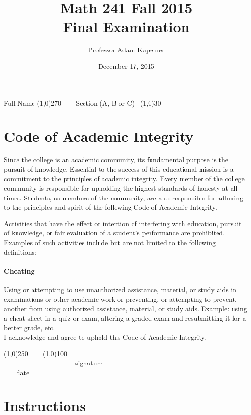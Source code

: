 \documentclass[12pt]{article}
\title{Math 241 Fall 2015 \\ Final Examination}
\author{Professor Adam Kapelner}
\date{December 17, 2015}
\begin{document}
\maketitle

\noindent Full Name \line(1,0){270} ~~~ Section (A, B or C)~ \line(1,0){30}

\thispagestyle{empty}

\section*{Code of Academic Integrity}

\footnotesize
Since the college is an academic community, its fundamental purpose is the pursuit of knowledge. Essential to the success of this educational mission is a commitment to the principles of academic integrity. Every member of the college community is responsible for upholding the highest standards of honesty at all times. Students, as members of the community, are also responsible for adhering to the principles and spirit of the following Code of Academic Integrity.

Activities that have the effect or intention of interfering with education, pursuit of knowledge, or fair evaluation of a student's performance are prohibited. Examples of such activities include but are not limited to the following definitions:

\paragraph{Cheating} Using or attempting to use unauthorized assistance, material, or study aids in examinations or other academic work or preventing, or attempting to prevent, another from using authorized assistance, material, or study aids. Example: using a cheat sheet in a quiz or exam, altering a graded exam and resubmitting it for a better grade, etc.
\\

\noindent I acknowledge and agree to uphold this Code of Academic Integrity. \\

\begin{center}
\line(1,0){250} ~~~ \line(1,0){100}\\
~~~~~~~~~~~~~~~~~~~~~signature~~~~~~~~~~~~~~~~~~~~~~~~~~~~~~~~~~~~~~~~~~~~~ date
\end{center}

\normalsize

\section*{Instructions}
\end{document}
